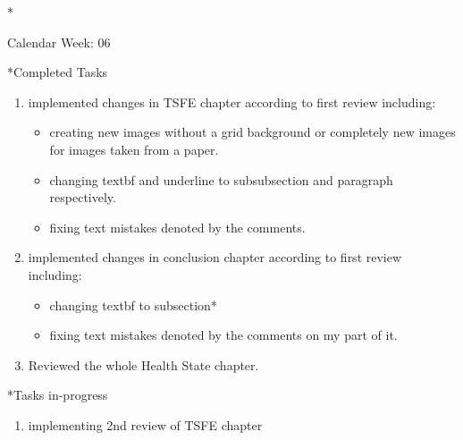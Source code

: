 \documentclass[11pt,a4paper]{article}
\begin{document}
\newpage
\begin{section}*{Calendar Week: 06 \hfill \date{12 February, 2021}}
	
	\begin{subsection}*{Completed Tasks}
		\begin{enumerate}
			\item implemented changes in TSFE chapter according to first review including:
			\begin{itemize}
				\item creating new images without a grid background or completely new images for images taken from a paper.
				\item changing textbf and underline to subsubsection and paragraph respectively.
				\item fixing text mistakes denoted by the comments.
			\end{itemize}
			\item implemented changes in conclusion chapter according to first review including:
			\begin{itemize}
				\item changing textbf to subsection*
				\item fixing text mistakes denoted by the comments on my part of it.
			\end{itemize}
			\item Reviewed the whole Health State chapter.
		\end{enumerate}
	\end{subsection}
	
	\begin{subsection}*{Tasks in-progress}
		\begin{enumerate}
			\item implementing 2nd review of TSFE chapter
		\end{enumerate}
	\end{subsection}
	
\end{section}
\end{document}
